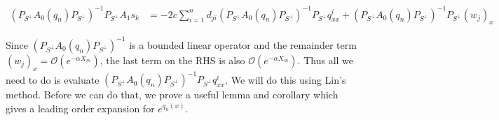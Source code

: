 \documentclass[12pt]{article}
\begin{document}
\begin{align*}
(P_{S^\perp} A_0(q_n) P_{S^\perp})^{-1} P_{S^\perp} A_1 s_k 
&= -2c \sum_{i = 1}^{n} d_{ji} (P_{S^\perp} A_0(q_n) P_{S^\perp})^{-1} P_{S^\perp} q^i_{xx} + (P_{S^\perp} A_0(q_n) P_{S^\perp})^{-1} P_{S^\perp} (w_j)_x 
\end{align*}

Since $(P_{S^\perp} A_0(q_n) P_{S^\perp})^{-1}$ is a bounded linear operator and the remainder term $(w_j)_x = \mathcal{O}(e^{-\alpha X_m})$, the last term on the RHS is also $\mathcal{O}(e^{-\alpha X_m})$. Thus all we need to do is evaluate $(P_{S^\perp} A_0(q_n) P_{S^\perp})^{-1} P_{S^\perp} q^i_{xx}$. We will do this using Lin's method. Before we can do that, we prove a useful lemma and corollary which gives a leading order expansion for $e^{q_n(x)}$.

\end{document}
